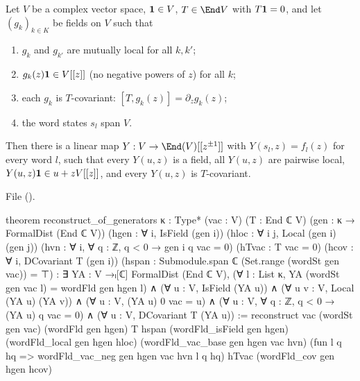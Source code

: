 \begin{theorem}\label{l11:thm:recongen}
Let $V$ be a complex vector space, $\mathbf{1}\in V$, $T\in\End V$ with $T\mathbf{1} = 0$, and let $(g_k)_{k\in K}$ be fields on $V$
such that
\begin{enumerate}
\item $g_k$ and $g_{k'}$ are mutually local for all $k,k'$;
\item $g_k(z)\mathbf{1}\in V[[z]]$ (no negative powers of $z$) for all $k$;
\item each $g_k$ is $T$-covariant: $[T,g_k(z)] = \partial_zg_k(z)$;
\item the word states $s_l$ span $V$.
\end{enumerate}
Then there is a linear map $Y:V\to\End(V)[[z^{\pm1}]]$ with $Y(s_l,z) = f_l(z)$ for every word $l$, such that every $Y(u,z)$ is a
field, all $Y(u,z)$ are pairwise local, $Y(u,z)\mathbf{1}\in u+zV[[z]]$, and every $Y(u,z)$ is $T$-covariant.
\end{theorem}
\noindent File 
(\allowbreak{}\allowbreak{}\allowbreak{}\allowbreak{}).
\begin{leancode}
theorem reconstruct_of_generators {κ : Type*} (vac : V) (T : End ℂ V)
    (gen : κ → FormalDist (End ℂ V))
    (hgen : ∀ i, IsField (gen i))
    (hloc : ∀ i j, Local (gen i) (gen j))
    (hvn : ∀ i, ∀ q : ℤ, q < 0 → gen i q vac = 0)
    (hTvac : T vac = 0)
    (hcov : ∀ i, DCovariant T (gen i))
    (hspan : Submodule.span ℂ (Set.range (wordSt gen vac)) = ⊤) :
    ∃ YA : V →ₗ[ℂ] FormalDist (End ℂ V),
      (∀ l : List κ, YA (wordSt gen vac l) = wordFld gen hgen l) ∧
      (∀ u : V, IsField (YA u)) ∧
      (∀ u v : V, Local (YA u) (YA v)) ∧
      (∀ u : V, (YA u) 0 vac = u) ∧
      (∀ u : V, ∀ q : ℤ, q < 0 → (YA u) q vac = 0) ∧
      (∀ u : V, DCovariant T (YA u)) :=
  reconstruct vac (wordSt gen vac) (wordFld gen hgen) T hspan
    (wordFld_isField gen hgen) (wordFld_local gen hgen hloc)
    (wordFld_vac_base gen hgen vac hvn)
    (fun l q hq => wordFld_vac_neg gen hgen vac hvn l q hq)
    hTvac (wordFld_cov gen hgen hcov)
\end{leancode}


